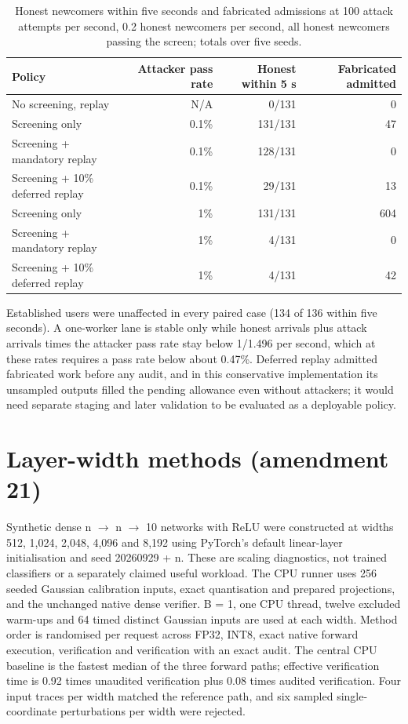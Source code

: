 \documentclass[11pt]{article}
\newcommand{\botrule}{\bottomrule}
\begin{document}
\begin{table}[htbp]
\caption{Honest newcomers within five seconds and fabricated admissions at 100 attack attempts per second, 0.2 honest newcomers per second, all honest newcomers passing the screen; totals over five seeds.}
\centering
\small
\begin{tabularx}{\textwidth}{Xrrr}
\toprule
Policy & Attacker pass rate & Honest within 5 s & Fabricated admitted \\
\midrule
No screening, replay & N/A & 0/131 & 0 \\
Screening only & 0.1\% & 131/131 & 47 \\
Screening + mandatory replay & 0.1\% & 128/131 & 0 \\
Screening + 10\% deferred replay & 0.1\% & 29/131 & 13 \\
Screening only & 1\% & 131/131 & 604 \\
Screening + mandatory replay & 1\% & 4/131 & 0 \\
Screening + 10\% deferred replay & 1\% & 4/131 & 42 \\
\botrule
\end{tabularx}
\end{table}

Established users were unaffected in every paired case (134 of 136 within five seconds). A one-worker lane is stable only while honest arrivals plus attack arrivals times the attacker pass rate stay below 1/1.496 per second, which at these rates requires a pass rate below about 0.47\%. Deferred replay admitted fabricated work before any audit, and in this conservative implementation its unsampled outputs filled the pending allowance even without attackers; it would need separate staging and later validation to be evaluated as a deployable policy.

\section{Layer-width methods (amendment 21)}

Synthetic dense n $\rightarrow$ n $\rightarrow$ 10 networks with ReLU were constructed at widths 512, 1,024, 2,048, 4,096 and 8,192 using PyTorch's default linear-layer initialisation and seed 20260929 + n. These are scaling diagnostics, not trained classifiers or a separately claimed useful workload. The CPU runner uses 256 seeded Gaussian calibration inputs, exact quantisation and prepared projections, and the unchanged native dense verifier. B = 1, one CPU thread, twelve excluded warm-ups and 64 timed distinct Gaussian inputs are used at each width. Method order is randomised per request across FP32, INT8, exact native forward execution, verification and verification with an exact audit. The central CPU baseline is the fastest median of the three forward paths; effective verification time is 0.92 times unaudited verification plus 0.08 times audited verification. Four input traces per width matched the reference path, and six sampled single-coordinate perturbations per width were rejected.
\end{document}
